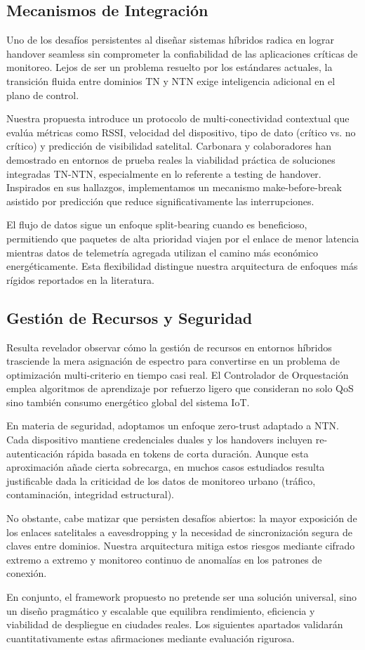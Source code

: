 \subsection{Mecanismos de Integración}

Uno de los desafíos persistentes al diseñar sistemas híbridos radica en lograr handover seamless sin comprometer la confiabilidad de las aplicaciones críticas de monitoreo. Lejos de ser un problema resuelto por los estándares actuales, la transición fluida entre dominios TN y NTN exige inteligencia adicional en el plano de control.

Nuestra propuesta introduce un protocolo de multi-conectividad contextual que evalúa métricas como RSSI, velocidad del dispositivo, tipo de dato (crítico vs. no crítico) y predicción de visibilidad satelital. Carbonara y colaboradores \cite{Carbonara2025} han demostrado en entornos de prueba reales la viabilidad práctica de soluciones integradas TN-NTN, especialmente en lo referente a testing de handover. Inspirados en sus hallazgos, implementamos un mecanismo make-before-break asistido por predicción que reduce significativamente las interrupciones.

El flujo de datos sigue un enfoque split-bearing cuando es beneficioso, permitiendo que paquetes de alta prioridad viajen por el enlace de menor latencia mientras datos de telemetría agregada utilizan el camino más económico energéticamente. Esta flexibilidad distingue nuestra arquitectura de enfoques más rígidos reportados en la literatura.

\subsection{Gestión de Recursos y Seguridad}

Resulta revelador observar cómo la gestión de recursos en entornos híbridos trasciende la mera asignación de espectro para convertirse en un problema de optimización multi-criterio en tiempo casi real. El Controlador de Orquestación emplea algoritmos de aprendizaje por refuerzo ligero que consideran no solo QoS sino también consumo energético global del sistema IoT.

En materia de seguridad, adoptamos un enfoque zero-trust adaptado a NTN. Cada dispositivo mantiene credenciales duales y los handovers incluyen re-autenticación rápida basada en tokens de corta duración. Aunque esta aproximación añade cierta sobrecarga, en muchos casos estudiados resulta justificable dada la criticidad de los datos de monitoreo urbano (tráfico, contaminación, integridad estructural).

No obstante, cabe matizar que persisten desafíos abiertos: la mayor exposición de los enlaces satelitales a eavesdropping y la necesidad de sincronización segura de claves entre dominios. Nuestra arquitectura mitiga estos riesgos mediante cifrado extremo a extremo y monitoreo continuo de anomalías en los patrones de conexión. 

En conjunto, el framework propuesto no pretende ser una solución universal, sino un diseño pragmático y escalable que equilibra rendimiento, eficiencia y viabilidad de despliegue en ciudades reales. Los siguientes apartados validarán cuantitativamente estas afirmaciones mediante evaluación rigurosa.